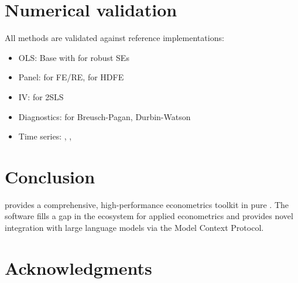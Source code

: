 \section{Numerical validation} \label{sec:validation}


All methods are validated against reference  implementations:

\begin{itemize}
  \item OLS: Base   with  for robust SEs
  \item Panel:  for FE/RE,  for HDFE
  \item IV:  \citep{AER} for 2SLS
  \item Diagnostics:  \citep{lmtest} for Breusch-Pagan, Durbin-Watson
  \item Time series: ,  \citep{vars},  \citep{urca}
\end{itemize}



\section{Conclusion} \label{sec:conclusion}


 provides a comprehensive, high-performance econometrics
toolkit in pure . The software fills a gap in the 
ecosystem for applied econometrics and provides novel integration with large
language models via the Model Context Protocol.



\section*{Acknowledgments}




